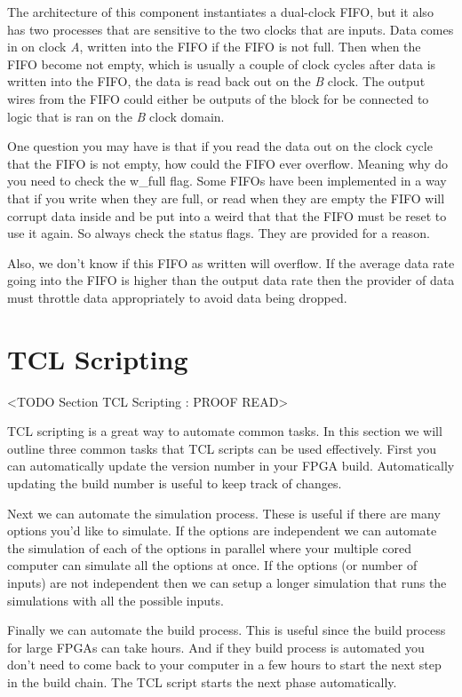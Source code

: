 The architecture of this component instantiates a dual-clock \ac{FIFO}, but it also has two processes that are sensitive to the two clocks that are inputs. Data comes in on clock \emph{A}, written into the \ac{FIFO} if the \ac{FIFO} is not full. Then when the \ac{FIFO} become not empty, which is usually a couple of clock cycles after data is written into the \ac{FIFO}, the data is read back out on the \emph{B} clock. The output wires from the \ac{FIFO} could either be outputs of the block for be connected to logic that is ran on the \emph{B} clock domain. 

One question you may have is that if you read the data out on the clock cycle that the \ac{FIFO} is not empty, how could the \ac{FIFO} ever overflow. Meaning why do you need to check the w\_full flag. Some \ac{FIFO}s have been implemented in a way that if you write when they are full, or read when they are empty the \ac{FIFO} will corrupt data inside and be put into a weird that that the \ac{FIFO} must be reset to use it again. So always check the status flags. They are provided for a reason.

Also, we don't know if this \ac{FIFO} as written will overflow. If the average data rate going into the \ac{FIFO} is higher than the output data rate then the provider of data must throttle data appropriately to avoid data being dropped. 

	
\section{TCL Scripting}
	<TODO Section TCL Scripting : PROOF READ>

\ac{TCL} scripting is a great way to automate common tasks. In this section we will outline three common tasks that \ac{TCL} scripts can be used effectively. First you can automatically update the version number in your \ac{FPGA} build. Automatically updating the build number is useful to keep track of changes. 

Next we can automate the simulation process. These is useful if there are many options you'd like to simulate. If the options are independent we can automate the simulation of each of the options in parallel where your multiple cored computer can simulate all the options at once. If the options (or number of inputs) are not independent then we can setup a longer simulation that runs the simulations with all the possible inputs.

Finally we can automate the build process. This is useful since the build process for large \ac{FPGA}s can take hours. And if they build process is automated you don't need to come back to your computer in a few hours to start the next step in the build chain. The \ac{TCL} script starts the next phase automatically.

